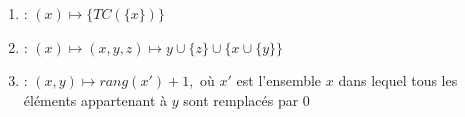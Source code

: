 \documentclass[a4paper, 11pt]{article}
\begin{document}
\begin{enumerate}
    \item {}: $(x) \mapsto \{TC(\{x\})\}$
    \item {}: $(x) \mapsto (x, y, z) \mapsto y \cup \{z\} \cup \{x \cup \{y\}\}$
    \item {}: $(x, y) \mapsto rang(x') + 1, \mbox{ où } x' $ est l'ensemble $x$ dans lequel tous les éléments appartenant à $y$ sont remplacés par $0$
\end{enumerate}
\end{document}
